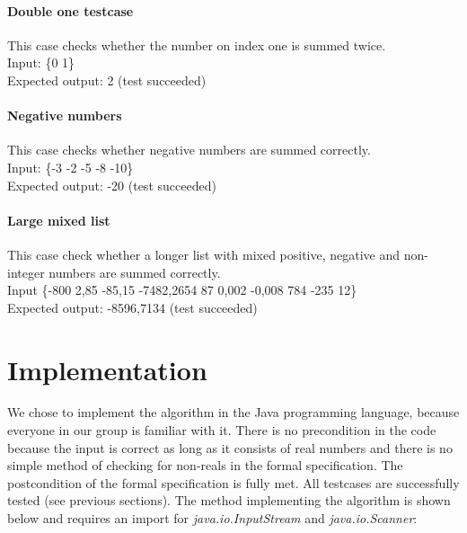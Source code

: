 \documentclass[12pt]{article}
\begin{document}
\paragraph{Double one testcase}
This case checks whether the number on index one is summed twice. \\
Input: \{0 1\} \\
Expected output: 2 (test succeeded)

\paragraph{Negative numbers}
This case checks whether negative numbers are summed correctly. \\
Input: \{-3 -2 -5 -8 -10\} \\
Expected output: -20 (test succeeded)

\paragraph{Large mixed list}
This case check whether a longer list with mixed positive, negative and non-integer numbers are summed correctly. \\
Input \{-800 2,85 -85,15 -7482,2654 87 0,002 -0,008 784 -235 12\} \\
Expected output: -8596,7134 (test succeeded)

\section{Implementation}
We chose to implement the algorithm in the Java programming language, because everyone in our group is familiar with it. There is no precondition in the code because the input is correct as long as it consists of real numbers and there is no simple method of checking for non-reals in the formal specification. The postcondition of the formal specification is fully met. All testcases are successfully tested (see previous sections). The method implementing the algorithm is shown below and requires an import for \textsl{java.io.InputStream} and \textsl{java.io.Scanner}:
\end{document}
